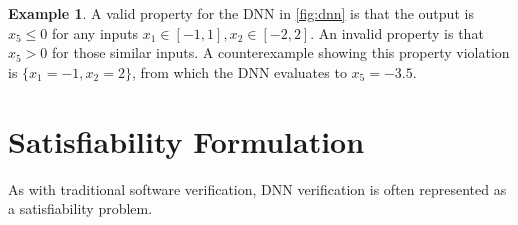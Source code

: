 \documentclass[oneside,11pt,dvipsnames]{book}
\numberwithin{equation}{section}
\theoremstyle{definition}
\newtheorem{example}{Example}[section]
\theoremstyle{remark}
\begin{document}




\begin{example}
A valid property for the DNN in \autoref{fig:dnn} is that the output is $x_5 \le 0$ for any inputs $x_1 \in [-1,1], x_2\in[-2,2]$. An invalid property is that $x_5 > 0$ for those similar inputs.
A counterexample showing this property violation is $\{x_1=-1, x_2=2\}$, from which the DNN evaluates to $x_5=-3.5$. 
\end{example}



\section{Satisfiability Formulation}\label{sec:satisfiability-and-activation-pattern-search}

 As with traditional software verification, DNN verification is often represented as a satisfiability problem.
\end{document}
